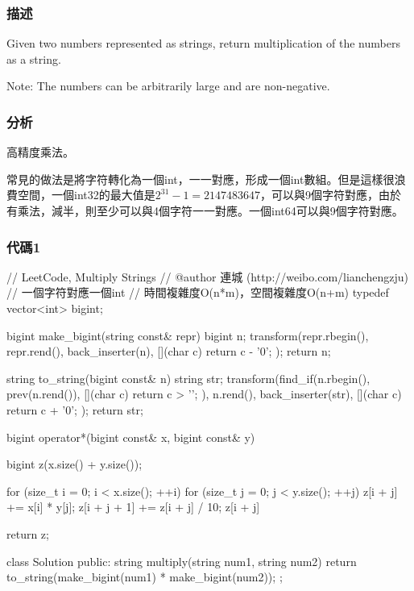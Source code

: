 \subsubsection{描述}
Given two numbers represented as strings, return multiplication of the numbers as a string.

Note: The numbers can be arbitrarily large and are non-negative.


\subsubsection{分析}
高精度乘法。

常見的做法是將字符轉化為一個int，一一對應，形成一個int數組。但是這樣很浪費空間，一個int32的最大值是$2^{31}-1=2147483647$，可以與9個字符對應，由於有乘法，減半，則至少可以與4個字符一一對應。一個int64可以與9個字符對應。


\subsubsection{代碼1}
\begin{Code}
// LeetCode, Multiply Strings
// @author 連城 (http://weibo.com/lianchengzju)
// 一個字符對應一個int
// 時間複雜度O(n*m)，空間複雜度O(n+m)
typedef vector<int> bigint;

bigint make_bigint(string const& repr) {
    bigint n;
    transform(repr.rbegin(), repr.rend(), back_inserter(n),
            [](char c) { return c - '0'; });
    return n;
}

string to_string(bigint const& n) {
    string str;
    transform(find_if(n.rbegin(), prev(n.rend()),
            [](char c) { return c > '\0'; }), n.rend(), back_inserter(str),
            [](char c) { return c + '0'; });
    return str;
}

bigint operator*(bigint const& x, bigint const& y) {
    bigint z(x.size() + y.size());

    for (size_t i = 0; i < x.size(); ++i)
        for (size_t j = 0; j < y.size(); ++j) {
            z[i + j] += x[i] * y[j];
            z[i + j + 1] += z[i + j] / 10;
            z[i + j] %
        }

    return z;
}

class Solution {
public:
    string multiply(string num1, string num2) {
        return to_string(make_bigint(num1) * make_bigint(num2));
    }
};
\end{Code}


